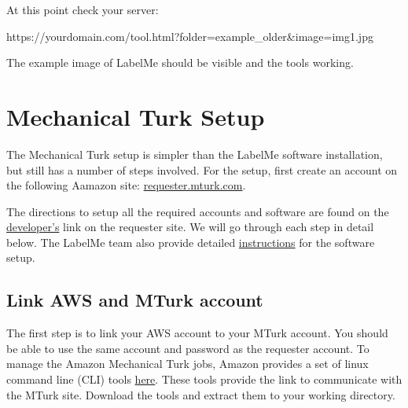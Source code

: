 \documentclass[a4paper]{article}
\begin{document}
\bigskip

At this point check your server:

https://yourdomain.com/tool.html?folder=example\_older\&image=img1.jpg

\bigskip


The example image of LabelMe should be visible and the tools working.


\section{Mechanical Turk Setup}

The Mechanical Turk setup is simpler than the LabelMe software installation, but still has a number of steps involved. For the setup, first create an account on the following Aamazon site: \href{https://requester.mturk.com}{requester.mturk.com}. 

\bigskip

The directions to setup all the required accounts and software are found on the \href{https://requester.mturk.com/developer}{developer's} link on the requester site. We will go through each step in detail below. The LabelMe team also provide detailed \href{http://labelme2.csail.mit.edu/Release3.0/browserTools/php/mechanical_turk.php
}{instructions} for the software setup. 
	

\subsection{Link AWS and MTurk account}
The first step is to link your AWS account to your MTurk account. You should be able to use the same account and password as the requester account. To manage the Amazon Mechanical Turk jobs, Amazon provides a set of linux command line (CLI) tools \href{https://requester.mturk.com/developer/tools/clt
}{here}. These tools provide the link to communicate with the MTurk site. Download the tools and extract them to your working directory. 
\end{document}
